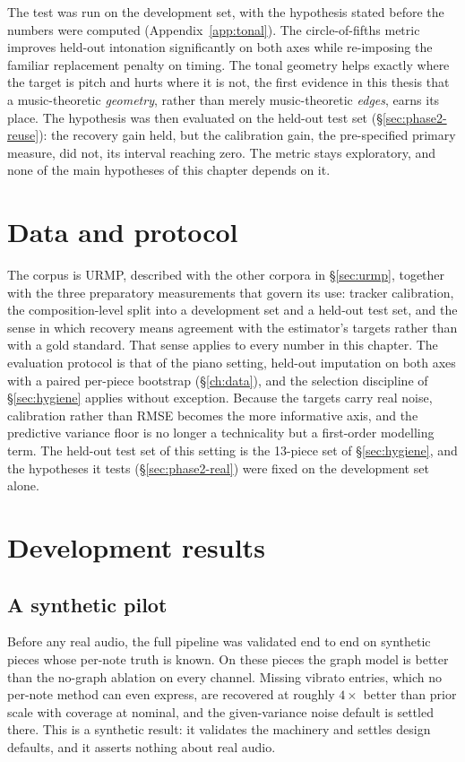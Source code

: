The test was run on the development set, with the hypothesis stated
before the numbers were computed (Appendix~\ref{app:tonal}). The
circle-of-fifths metric improves held-out intonation significantly on
both axes while re-imposing the familiar replacement penalty on timing.
The tonal geometry helps exactly where the target is pitch and hurts
where it is not, the first evidence in this thesis that a music-theoretic
\emph{geometry}, rather than merely music-theoretic \emph{edges}, earns
its place. The hypothesis was then evaluated on the held-out test set
(\S\ref{sec:phase2-reuse}): the recovery gain held, but the calibration
gain, the pre-specified primary measure, did not, its interval reaching
zero. The metric stays exploratory, and none of the main hypotheses of
this chapter depends on it.


\section{Data and protocol}\label{sec:phase2-protocol}
The corpus is URMP, described with the other corpora in \S\ref{sec:urmp},
together with the three preparatory measurements that govern its use:
tracker calibration, the composition-level split into a development set
and a held-out test set, and the sense in which recovery means agreement
with the estimator's targets rather than with a gold standard. That sense
applies to every number in this chapter. The evaluation protocol is that
of the piano setting, held-out imputation on both axes with a paired
per-piece bootstrap (\S\ref{ch:data}), and the selection discipline of
\S\ref{sec:hygiene} applies without exception. Because the targets carry
real noise, calibration rather than RMSE becomes the more informative
axis, and the predictive variance floor is no longer a technicality but a
first-order modelling term. The held-out test set of this setting is the 13-piece set of
\S\ref{sec:hygiene}, and the hypotheses it tests
(\S\ref{sec:phase2-real}) were fixed on the development set alone.


\section{Development results}\label{sec:phase2-devres}

\subsection{A synthetic pilot}
\label{sec:phase2-pilot}
Before any real audio, the full pipeline was validated end to end on
synthetic pieces whose per-note truth is known. On these pieces the graph
model is better than the no-graph ablation on every channel. Missing
vibrato entries, which no per-note method can even express, are recovered
at roughly $4\times$ better than prior scale with coverage at nominal,
and the given-variance noise default is settled there. This is a
synthetic result: it validates the machinery and settles design
defaults, and it asserts nothing about real audio.

